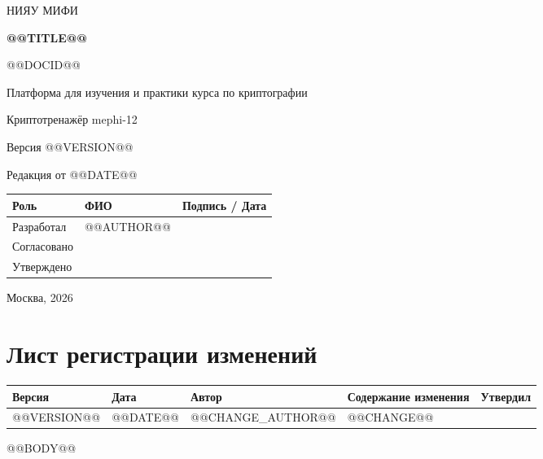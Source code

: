 \documentclass[12pt,a4paper]{article}
\begin{document}
\hypersetup{pageanchor=false}
\begin{titlepage}
  \thispagestyle{empty}
  \centering
  {\large НИЯУ МИФИ\par}
  \vspace*{3.5cm}
  {\LARGE\bfseries @@TITLE@@\par}
  \vspace{0.5cm}
  {\large @@DOCID@@\par}
  \vspace{0.6cm}
  {\large Платформа для изучения и практики курса по криптографии\par}
  {\large Криптотренажёр mephi-12\par}
  \vspace{0.7cm}
  {\large Версия @@VERSION@@\par}
  {\large Редакция от @@DATE@@\par}
  \vspace{1cm}
  \begin{tabularx}{\textwidth}{@{}p{3.4cm}Xp{4cm}@{}}
    \toprule
    Роль & ФИО & Подпись / Дата \\
    \midrule
    Разработал & @@AUTHOR@@ & \\
    \addlinespace[6pt]
    Согласовано & & \\
    \addlinespace[6pt]
    Утверждено & & \\
    \bottomrule
  \end{tabularx}
  \vfill
  {\large Москва, 2026\par}
\end{titlepage}
\hypersetup{pageanchor=true}

\section*{Лист регистрации изменений}
\begingroup\small\singlespacing
\noindent
\begin{tabularx}{\textwidth}{@{}p{1.2cm}p{2cm}p{2.5cm}Xp{1.8cm}@{}}
\toprule
Версия & Дата & Автор & Содержание изменения & Утвердил \\
\midrule
@@VERSION@@ & @@DATE@@ & @@CHANGE_AUTHOR@@ & @@CHANGE@@ & \\
\bottomrule
\end{tabularx}
\endgroup
\clearpage
\begingroup\small\singlespacing
\tableofcontents
\endgroup
\clearpage

@@BODY@@
\end{document}
